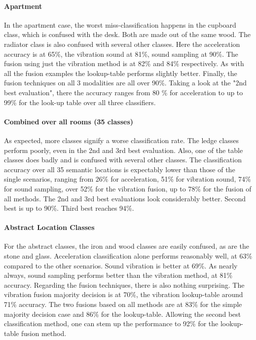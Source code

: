 \paragraph{Apartment}
In the apartment case, the worst miss-classification happens in the
cupboard class, which is confused with the desk. Both are made out
of the same wood. The radiator class is also confused with several
other classes. Here the acceleration accuracy is at 65\%, the
vibration sound at 81\%, sound sampling at 90\%. The fusion using just
the vibration method is at 82\% and 84\% respectively. As with all the
fusion examples the lookup-table performs slightly better. Finally, the
fusion techniques on all 3 modalities are all over 90\%. Taking a
look at the "2nd best evaluation", there the accuracy ranges from 80
\% for acceleration to up to 99\% for the look-up table over all three
classifiers.

\paragraph{Combined over all rooms (35 classes)}
As expected, more classes signify a worse classification rate. The ledge classes perform
poorly, even in the 2nd and 3rd best evaluation. Also, one of the
table classes does badly and is confused with several other classes.
The classification accuracy over all 35 semantic locations is
expectably lower than those of the single scenarios, ranging from 26\%
for acceleration, 51\% for vibration sound, 74\% for sound sampling,
over 52\% for the vibration fusion, up to 78\% for the fusion of all
methods. The 2nd and 3rd best evaluations look considerably
better. Second best is up to 90\%. Third best reaches 94\%. 

\paragraph{Abstract Location Classes}
For the abstract classes, the iron and wood classes are easily
confused, as are the stone and glass. Acceleration classification
alone performs reasonably well, at 63\% compared to the other
scenarios. Sound vibration is better at 69\%. As nearly always, sound
sampling performs better than the vibration method, at 81\% accuracy.
Regarding the fusion techniques, there is also nothing surprising. The
vibration fusion majority decision is at 70\%, the vibration
lookup-table around 71\% accuracy. The two fusions based on all
methods are at 83\% for the simple majority decision case and 86\% for
the lookup-table. Allowing the second best classification method, one
can stem up the performance to 92\% for the lookup-table fusion
method.

